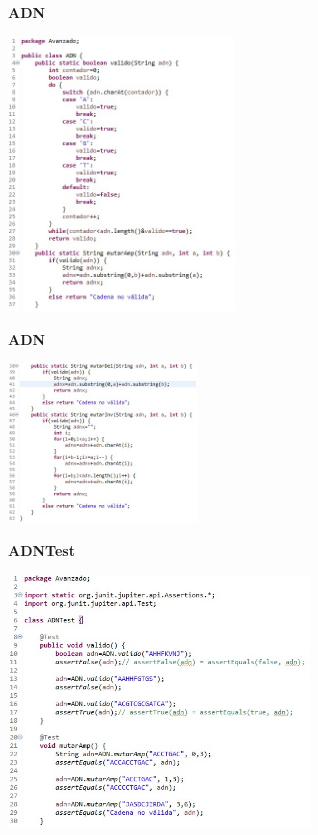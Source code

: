 \documentclass[11pt]{beamer}
\begin{document}

\begin{frame}{\textbf{ADN}}

\begin{center}
\includegraphics[width=6.0cm]{img/Ejemplo4.1.jpeg}
\end{center}

\end{frame}


\begin{frame}{\textbf{ADN}}

\begin{center}
\includegraphics[width=5.0cm]{img/Ejemplo4.2.jpeg}
\end{center}

\end{frame}


\begin{frame}{\textbf{ADNTest}}

\begin{center}
\includegraphics[width=8.0cm]{img/Prueba4.1.jpeg}
\end{center}

\end{frame}
\end{document}
